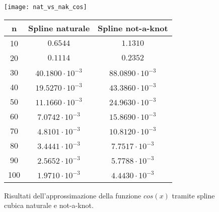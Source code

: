 \begin{figure}
  \centering
  \texttt{[image: nat\_vs\_nak\_cos]}
  \begin{tabular}{|c|c|c|}
    \hline
    n & Spline naturale & Spline not-a-knot \\
    \hline\hline
    10 & $0.6544$ & $1.1310$ \\
    \hline
    20 & $0.1114$ & $0.2352$ \\
    \hline
    30 & $40.1800 \cdot 10^{-3}$ & $88.0890 \cdot 10^{-3}$ \\
    \hline
    40 & $19.5270 \cdot 10^{-3}$ & $43.3860 \cdot 10^{-3}$ \\
    \hline
    50 & $11.1660 \cdot 10^{-3}$ & $24.9630 \cdot 10^{-3}$ \\
    \hline
    60 & $7.0742 \cdot 10^{-3}$ & $15.8690 \cdot 10^{-3}$ \\
    \hline
    70 & $4.8101 \cdot 10^{-3}$ & $10.8120 \cdot 10^{-3}$ \\
    \hline
    80 & $3.4441 \cdot 10^{-3}$ & $7.7517 \cdot 10^{-3}$ \\
    \hline
    90 & $2.5652 \cdot 10^{-3}$ & $5.7788 \cdot 10^{-3}$ \\
    \hline
    100 & $1.9710 \cdot 10^{-3}$ & $4.4430 \cdot 10^{-3}$ \\
    \hline
  \end{tabular}
  \caption{Risultati dell'approssimazione della funzione $cos(x)$ tramite spline cubica naturale e not-a-knot.}
  \label{fig:approxCos}
\end{figure}
